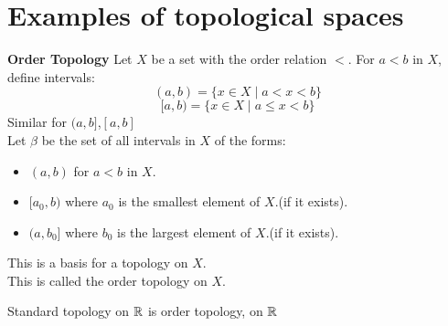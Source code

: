 \section{Examples of topological spaces}

\begin{example}{\textbf{Order Topology}}{}
    Let $X$ be a set with the order relation $<$. For $a<b$ in $X$, define intervals:
    \[(a,b)=\{x \in X \mid a < x < b\}\]
    \[[a,b)=\{x \in X \mid a \leq x < b\}\]
    Similar for $(a,b]$,$[a,b]$\\
    Let $\beta$ be the set of all intervals in $X$ of the forms:
    \begin{itemize}
        \item $(a,b)$ for $a<b$ in $X$.
        \item $[a_0,b)$ where $a_0$ is the smallest element of $X$.(if it exists).
        \item $(a,b_0]$ where $b_0$ is the largest element of $X$.(if it exists).
    \end{itemize}
\end{example}
\begin{proposition}{}{}
    This is a basis for a topology on $X$.\\
    This is called the order topology on $X$.
\end{proposition}
\begin{example*}{}{}
    Standard topology on $\mathbb{R}$ is order topology, on $\mathbb{R}$
\end{example*}

